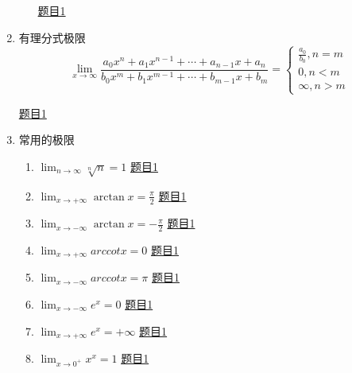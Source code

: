 \documentclass[12pt]{article} %
\begin{document}
\begin{enumerate}
\begin{enumerate}
        \quad \href{https://www.matongxue.com/matex/2605/react/}{题目1}
    \end{enumerate}
\item 有理分式极限
$$
\lim _{x \rightarrow \infty} \frac{a_{0} x^{n}+a_{1} x^{n-1}+\cdots+a_{n-1} x+a_{n}}{b_{0} x^{m}+b_{1} x^{m-1}+\cdots+b_{m-1} x+b_{m}}=\left\{\begin{array}{l}{
    \frac{a_{0}}{b_{0}}, n=m} \\ 
    {0, n<m} \\ 
{\infty, n>m}\end{array}\right.
$$
\par \href{https://www.matongxue.com/matex/2606/react/}{题目1}
\item 常用的极限
    \begin{enumerate}
        \item $\displaystyle\lim_{n\to\infty}\sqrt[n]{n}=1$
        \quad \href{https://www.matongxue.com/matex/2608/react/}{题目1}
        \item $\displaystyle\lim_{x\to+\infty}\arctan x=\frac{\pi}{2}$
        \quad \href{https://www.matongxue.com/matex/2609/react/}{题目1}
        \item $\displaystyle\lim_{x\to-\infty}\arctan x=-\frac{\pi}{2}$
        \quad \href{https://www.matongxue.com/matex/2610/react/}{题目1}
        \item $\displaystyle\lim_{x\to+\infty}arccot x=0$
        \quad \href{https://www.matongxue.com/matex/2611/react/}{题目1}
        \item $\displaystyle\lim_{x\to-\infty}arccot x=\pi$
        \quad \href{https://www.matongxue.com/matex/2612/react/}{题目1}
        \item $\displaystyle\lim_{x\to-\infty}e^x=0$
        \quad \href{https://www.matongxue.com/matex/2613/react/}{题目1}
        \item $\displaystyle\lim_{x\to+\infty}e^x=+\infty$
        \quad \href{https://www.matongxue.com/matex/2614/react/}{题目1}
        \item $\displaystyle\lim_{x\to 0^{+}}x^x=1$
        \quad \href{https://www.matongxue.com/matex/2615/react/}{题目1}
    \end{enumerate}
\end{enumerate}
\end{document}
